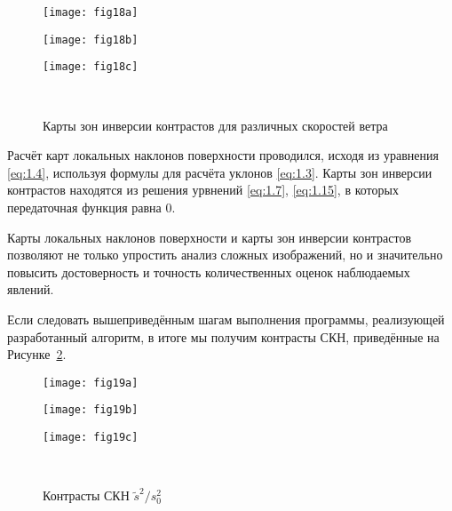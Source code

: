 \begin{figure}[!thb]
    	\centering
	\begin{minipage}{.33\textwidth}
	    \subcaptionbox{\label{fig:18a}}
		{\texttt{[image: fig18a]}}
	\end{minipage}
	\hfill
	\begin{minipage}{.31\textwidth}
	    \subcaptionbox{\label{fig:18b}}
		{\texttt{[image: fig18b]}}
	\end{minipage}
	\hfill
	\begin{minipage}{.31\textwidth}
	    \subcaptionbox{\label{fig:18c}}
		{\texttt{[image: fig18c]}}
	\end{minipage}
	\\
    \caption{Карты зон инверсии контрастов для различных скоростей ветра}
    \label{fig:18}
\end{figure}


Расчёт карт локальных наклонов поверхности проводился, исходя из уравнения \eqref{eq:1.4}, используя формулы для расчёта уклонов \eqref{eq:1.3}. Карты зон инверсии контрастов находятся из решения урвнений \eqref{eq:1.7}, \eqref{eq:1.15}, в которых передаточная функция равна 0.

Карты локальных наклонов поверхности и карты зон инверсии контрастов позволяют не только упростить анализ сложных изображений, но и значительно повысить достоверность и точность количественных оценок наблюдаемых явлений.

Если следовать вышеприведённым шагам выполнения программы, реализующей разработанный алгоритм, в итоге мы получим контрасты СКН, приведённые на Рисунке~\ref{fig:19}.



\begin{figure}[!thb]
    	\centering
	\begin{minipage}{.31\textwidth}
	    \subcaptionbox{\label{fig:19a}}
		{\texttt{[image: fig19a]}}
	\end{minipage}
	\hfill
	\begin{minipage}{.31\textwidth}
	    \subcaptionbox{\label{fig:19b}}
		{\texttt{[image: fig19b]}}
	\end{minipage}
	\hfill
	\begin{minipage}{.31\textwidth}
	    \subcaptionbox{\label{fig:19c}}
		{\texttt{[image: fig19c]}}
	\end{minipage}
	\\
    \caption{Контрасты СКН $\tilde{s}^{2} /s_{0}^{2} $}
    \label{fig:19}
\end{figure}


